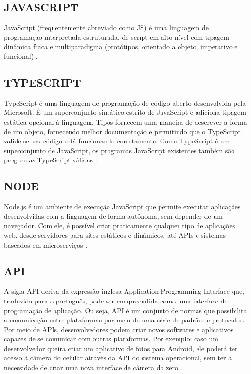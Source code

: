 \documentclass[a4paper,12pt]{article}
\begin{document}
\subsection{JAVASCRIPT}
JavaScript (frequentemente abreviado como JS) é uma linguagem de programação
interpretada estruturada, de script em alto nível com tipagem dinâmica fraca e
multiparadigma (protótipos, orientado a objeto,
imperativo e funcional) \cite{javascript}.
\subsection{TYPESCRIPT}
TypeScript é uma linguagem de programação de código aberto desenvolvida pela
Microsoft. É um superconjunto sintático estrito de JavaScript e adiciona tipagem
estática opcional à linguagem. Tipos fornecem uma maneira de descrever a forma de
um objeto, fornecendo melhor documentação e permitindo que o TypeScript valide
se seu código está funcionando corretamente.
Como TypeScript é um superconjunto de JavaScript, os programas JavaScript existentes também são programas TypeScript válidos \cite{typescript}.
\subsection{NODE}
Node.js é um ambiente de execução JavaScript que permite executar aplicações desenvolvidas com a linguagem de
forma autônoma, sem depender de um navegador. Com ele, é possível criar
praticamente qualquer tipo de aplicações web, desde servidores para
sites estáticos e dinâmicos, até APIs e sistemas baseados em microserviços \cite{node}.
\subsection{API}
A sigla API deriva da expressão inglesa Application Programming Interface que, traduzida para o português, pode ser compreendida como uma interface de programação de aplicação. Ou seja, API é um conjunto de normas que possibilita a comunicação entre plataformas por meio de uma série de padrões e protocolos.
Por meio de APIs, desenvolvedores podem criar novos softwares e aplicativos capazes de se comunicar com outras plataformas. Por exemplo: caso um desenvolvedor queira criar um aplicativo de fotos para Android, ele poderá ter acesso à câmera do celular através da API do sistema operacional, sem ter a necessidade de criar uma nova interface de câmera do zero \cite{api}.
\end{document}
